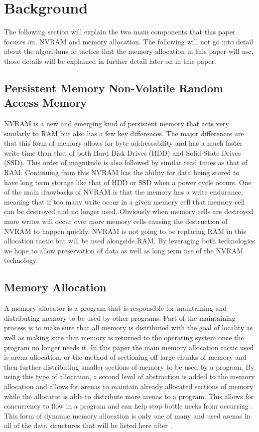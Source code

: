 \documentclass[conference]{IEEEtran}
\begin{document}
\section{Background}
The following section will explain the two main components that this paper focuses on, NVRAM and memory allocation. The following will not go into detail about the algorithms or tactics that the memory allocation in this paper will use, those details will be explained in further detail later on in this paper. 
\subsection{Persistent Memory Non-Volatile Random Access Memory}
NVRAM is a new and emerging kind of persistent memory that acts very similarly to RAM but also has a few key differences. The major differences are that this form of memory allows for byte addressability and has a much faster write time than that of both Hard Disk Drives (HDD) and Solid-State Drives (SSD)\cite{Makalu}. This order of magnitude is also followed by similar read times as that of RAM. Continuing from this NVRAM has the ability for data being stored to have long term storage like that of HDD or SSD when a power cycle occurs. One of the main drawbacks of NVRAM is that the memory has a write endurance, meaning that if too many write occur in a given memory cell that memory cell can be destroyed and no longer used. Obviously when memory cells are destroyed more writes will occur over more memory cells causing the destruction of NVRAM to happen quickly. NVRAM is not going to be replacing RAM in this allocation tactic but will be used alongside RAM. By leveraging both technologies we hope to allow preservation of data as well as long term use of the NVRAM technology\cite{Chatzistergiou}.
\subsection{Memory Allocation}
    A memory allocator is a program that is responsible for maintaining and distributing memory to be used by other programs. Part of the maintaining process is to make sure that all memory is distributed with the goal of locality as well as making sure that memory is returned to the operating system once the program no longer needs it. In this paper the main memory allocation tactic used is arena allocation, or the method of sectioning off large chunks of memory and then further distributing smaller sections of memory to be used by a program. By using this type of allocation, a second level of abstraction is added to the memory allocation and allows for arenas to maintain already allocated sections of memory while the allocator is able to distribute more arenas to a program. This allows for concurrency to flow in a program and can help stop bottle necks from occurring \cite{ScalableLock}. This form of dynamic memory allocation is only one of many and used arenas in all of the data structures \cite{Chatzistergiou} that will be listed here after \cite{DynaSOAr} \cite{FreeGuard}. 
\end{document}

